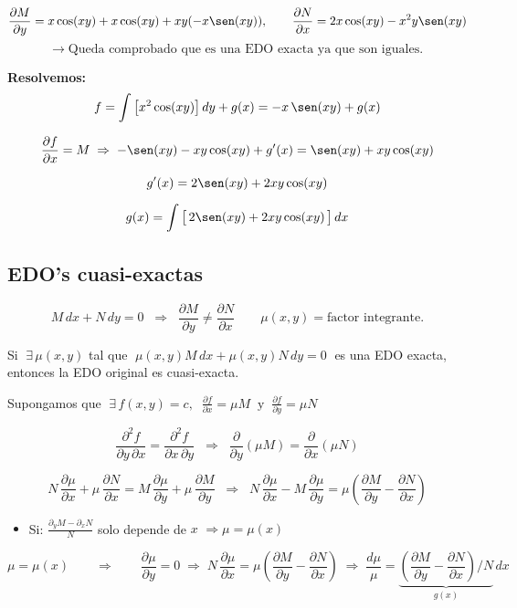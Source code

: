 \documentclass[a4paper,12pt]{article}
\begin{document}
\[
\frac{\partial M}{\partial y}
= x\cos(xy) + x\cos(xy) + xy(-x\sen(xy)),
\qquad
\frac{\partial N}{\partial x}
= 2x\cos(xy) - x^{2}y\sen(xy)
\]
\[
\longrightarrow\; \text{Queda comprobado que es una EDO exacta ya que son iguales.}
\]

\textbf{Resolvemos:}
\[
f=\int \big[x^{2}\cos(xy)\big]\,dy + g(x) = -x\,\sen(xy) + g(x)
\]

\[
\frac{\partial f}{\partial x}=M
\;\Rightarrow\;
-\sen(xy)-xy\cos(xy)+g'(x) = \sen(xy)+xy\cos(xy)
\]

\[
g'(x)=2\sen(xy)+2xy\cos(xy)
\]

\[
g(x)=\int \big[\,2\sen(xy)+2xy\cos(xy)\,\big]\,dx
\]
\subsection{EDO's cuasi-exactas}

\[
M\,dx + N\,dy = 0 \;\;\Rightarrow\;\; \frac{\partial M}{\partial y} \neq \frac{\partial N}{\partial x}
\qquad
\mu(x,y)=\text{factor integrante.}
\]

Si $\;\exists\,\mu(x,y)$ tal que $\;\mu(x,y)M\,dx+\mu(x,y)N\,dy=0\;$ es una EDO exacta, entonces la EDO original es cuasi-exacta.

\medskip
Supongamos que $\;\exists\,f(x,y)=c,\;\; \frac{\partial f}{\partial x}=\mu M\;\; \text{y}\;\; \frac{\partial f}{\partial y}=\mu N$

\[
\frac{\partial^2 f}{\partial y\,\partial x}=\frac{\partial^2 f}{\partial x\,\partial y}
\;\;\Rightarrow\;\;
\frac{\partial}{\partial y}(\mu M)=\frac{\partial}{\partial x}(\mu N)
\]

\[
N\,\frac{\partial \mu}{\partial x}+\mu\,\frac{\partial N}{\partial x}
=
M\,\frac{\partial \mu}{\partial y}+\mu\,\frac{\partial M}{\partial y}
\;\;\Rightarrow\;\;
N\,\frac{\partial \mu}{\partial x}-M\,\frac{\partial \mu}{\partial y}
=
\mu\!\left(\frac{\partial M}{\partial y}-\frac{\partial N}{\partial x}\right)
\]

\begin{itemize}
\item Si: $\displaystyle \frac{\partial_y M-\partial_x N}{N}$ solo depende de $x$ $\Rightarrow \mu=\mu(x)$
\end{itemize}

\[
\mu=\mu(x)
\qquad\Rightarrow\qquad
\frac{\partial \mu}{\partial y}=0
\;\Rightarrow\;
N\,\frac{\partial \mu}{\partial x}
=
\mu\!\left(\frac{\partial M}{\partial y}-\frac{\partial N}{\partial x}\right)
\;\Rightarrow\;
\frac{d\mu}{\mu}=
\underbrace{\left(\frac{\partial M}{\partial y}-\frac{\partial N}{\partial x}\right)\!\Big/\!N}_{g(x)}
\,dx
\]
\end{document}
